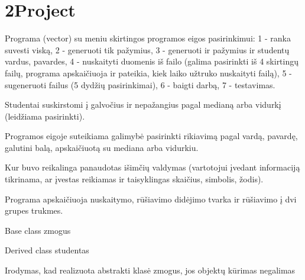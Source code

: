 \chapter{2Project}
\hypertarget{md__r_e_a_d_m_e}{}\label{md__r_e_a_d_m_e}
\label{md__r_e_a_d_m_e_autotoc_md0}%
%
Programa (vector) su meniu skirtingos programos eigos pasirinkimui\+: 1 -\/ ranka suvesti viską, 2 -\/ generuoti tik pažymius, 3 -\/ generuoti ir pažymius ir studentų vardus, pavardes, 4 -\/ nuskaityti duomenis iš failo (galima pasirinkti iš 4 skirtingų failų, programa apskaičiuoja ir pateikia, kiek laiko užtruko nuskaityti failą), 5 -\/ sugeneruoti failus (5 dydžių pasirinkimai), 6 -\/ baigti darbą, 7 -\/ testavimas.

Studentai suskirstomi į galvočius ir nepažangius pagal medianą arba vidurkį (leidžiama pasirinkti).

Programos eigoje suteikiama galimybė pasirinkti rikiavimą pagal vardą, pavardę, galutini balą, apskaičiuotą su mediana arba vidurkiu.

Kur buvo reikalinga panaudotas išimčių valdymas (vartotojui įvedant informaciją tikrinama, ar įvestas reikiamas ir taisyklingas skaičius, simbolis, žodis).

Programa apskaičiuoja nuskaitymo, rūšiavimo didėjimo tvarka ir rūšiavimo į dvi grupes trukmes.

Base class zmogus



Derived class studentas



Irodymas, kad realizuota abstrakti klasė zmogus, jos objektų kūrimas negalimas

 